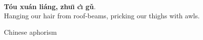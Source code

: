 \section*{}

\epigraph{\\
\textbf{Tóu xuán liáng, zhuı̄ cı̀ gǔ}.\\
Hanging our hair from roof-beams, pricking our thighs with awls.}{Chinese aphorism}